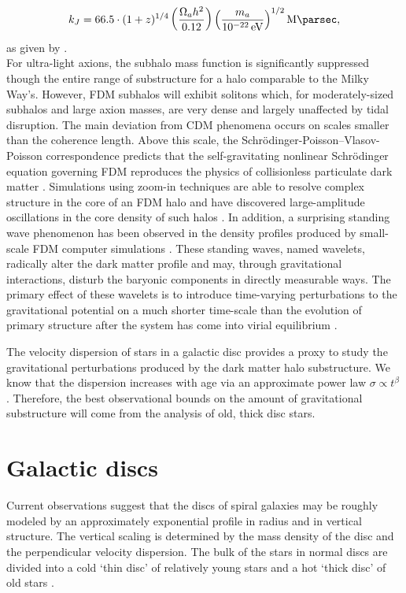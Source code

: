 \documentclass[usenatbib]{mnras}
\newcommand{\poweV}[1]{\SI{e#1}{\electronvolt}}
\begin{document}
\begin{equation}
k_J = 66.5 \cdot (1+z)^{1/4} \left( \frac{\Omega_a h^2}{0.12} \right) \left(\frac{m_a}{\poweV{-22}} \right)^{1/2} \si{\per\mega\parsec},
\end{equation}
\noindent
as given by \citet{axion_cosmology}. \\ For ultra-light axions, the subhalo mass function is significantly suppressed though the entire range of substructure for a halo comparable to the Milky Way’s. However, FDM subhalos will exhibit solitons which, for moderately-sized subhalos and large axion masses, are very dense and largely unaffected by tidal disruption. The main deviation from CDM phenomena occurs on scales smaller than the coherence length. Above this scale, the Schr\"{o}dinger-Poisson–Vlasov-Poisson correspondence predicts that the self-gravitating nonlinear Schr\"{o}dinger equation governing FDM reproduces the physics of collisionless particulate dark matter \citep{Schrodinger-Poisson}. Simulations using zoom-in techniques are able to resolve complex structure in the core of an FDM halo and have discovered large-amplitude oscillations in the core density of such halos \citep{structure-FDM-halos}. In addition, a surprising standing wave phenomenon has been observed in the density profiles produced by small-scale FDM computer simulations \citep{cold_and_fuzzy}. These standing waves, named wavelets, radically alter the dark matter profile and may, through gravitational interactions, disturb the baryonic components in directly measurable ways. The primary effect of these wavelets is to introduce time-varying perturbations to the gravitational potential on a much shorter time-scale than the evolution of primary structure after the system has come into virial equilibrium \citep{Schrodinger-Poisson}. 
\par
	The velocity dispersion of stars in a galactic disc provides a proxy to study the gravitational perturbations produced by the dark matter halo substructure. We know that the dispersion increases with age via an approximate power law $\sigma \propto t^\beta$ \citep{heating_history}. Therefore, the best observational bounds on the amount of gravitational substructure will come from the analysis of old, thick disc stars.  

\section{Galactic discs}

\hspace{5mm} Current observations suggest that the discs of spiral galaxies may be roughly modeled by an approximately exponential profile in radius and in vertical structure. The vertical scaling is determined by the mass density of the disc and the perpendicular velocity dispersion.  The bulk of the stars in normal discs are divided into a cold `thin disc' of relatively young stars and a hot `thick disc' of old stars \citep{binney_tremaine_2008}. 
\end{document}
